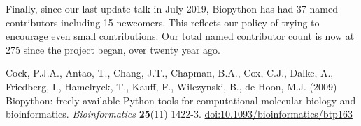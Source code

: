 \documentclass[10pt,oneside]{article}
\begin{document}
Finally, since our last update talk in July 2019, Biopython has had 37 named
contributors including 15 newcomers. This reflects our policy of trying to
encourage even small contributions. Our total named contributor count is now
at 275 since the project began, over twenty year ago.

\begin{thebibliography}{}

Cock, P.J.A., Antao, T., Chang, J.T., Chapman, B.A., Cox, C.J., Dalke, A., Friedberg, I., Hamelryck, T., Kauff, F., Wilczynski, B., de Hoon, M.J. (2009) Biopython: freely available Python tools for computational molecular biology and bioinformatics. {\it Bioinformatics} {\bf 25}(11) 1422-3. \href{http://dx.doi.org/10.1093/bioinformatics/btp163}{doi:10.1093/bioinformatics/btp163}

\end{thebibliography}
\end{document}
